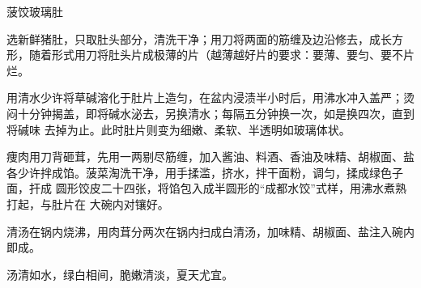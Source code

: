 \begin{recipe}{菠饺玻璃肚}

\ingredients


\preparation

\step 选新鲜猪肚，只取肚头部分，清洗干净；用刀将两面的筋缠及边沿修去，成长方
形，随着形式用刀将肚头片成极薄的片（越薄越好片的要求：要薄、要匀、要不片烂。

\step 用清水少许将草碱溶化于肚片上造匀，在盆内浸渍半小时后，用沸水冲入盖严；烫
闷十分钟揭盖，即将碱水泌去，另换清水；每隔五分钟换一次，如是换四次，直到将碱味
去掉为止。此时肚片则变为细嫩、柔软、半透明如玻璃体状。

\step 痩肉用刀背砸茸，先用一两剔尽筋缠，加入酱油、料酒、香油及味精、胡椒面、盐
各少许拌成馅。菠菜淘洗干净，用手揉滥，挤水，拌干面粉，调匀，揉成绿色子面，扞成
圆形饺皮二十四张，将馅包入成半圆形的“成都水饺”式样，用沸水煮熟打起，与肚片在
大碗内对镶好。

\step 清汤在锅内烧沸，用肉茸分两次在锅内扫成白清汤，加味精、胡椒面、盐注入碗内
即成。

\features

汤清如水，绿白相间，脆嫩清淡，夏天尤宜。

\end{recipe}

